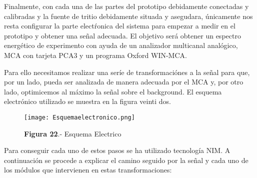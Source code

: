 Finalmente, con cada una de las partes del prototipo debidamente conectadas y calibradas y la fuente de tritio debidamente situada y asegudara, únicamente nos resta configurar la parte electŕonica del sistema para empezar a medir en el prototipo y obtener una señal adecuada. El objetivo será obtener un espectro energético de experimento con ayuda de un analizador multicanal analógico, MCA con tarjeta PCA3 y un programa Oxford WIN-MCA. 

Para ello necesitamos realizar una seríe de transformaciónes a la señal para que, por un lado,  pueda ser analizada de manera adecuada por el MCA y, por otro lado, optimicemos al máximo la señal sobre el background. El esquema electrónico utilizado se muestra en la figura veinti dos.

\begin{figure}[hbtp]
\centering
\texttt{[image: Esquemaelectronico.png]}
\caption{\textbf{Figura 22}.- Esquema Electrico}
\end{figure}

Para conseguir cada uno de estos pasos se ha utilizado tecnología NIM. A continuación se procede a explicar el camino seguido por la señal y cada uno de los módulos que intervienen en estas transformaciones:

